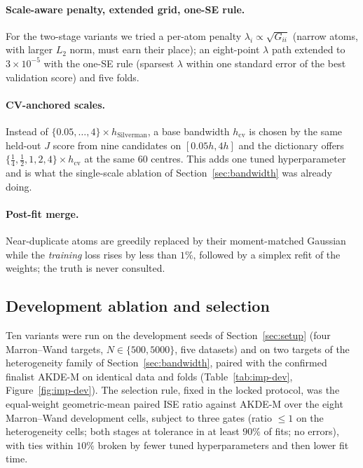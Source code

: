 \paragraph{Scale-aware penalty, extended grid, one-SE rule.} For the
two-stage variants we tried a per-atom penalty $\lambda_i \propto
\sqrt{G_{ii}}$ (narrow atoms, with larger $L_2$ norm, must earn their place);
an eight-point $\lambda$ path extended to $3\times10^{-5}$ with the one-SE
rule (sparsest $\lambda$ within one standard error of the best validation
score) and five folds.

\paragraph{CV-anchored scales.} Instead of $\{0.05,\dots,4\}\times
h_{\mathrm{Silverman}}$, a base bandwidth $h_{\mathrm{cv}}$ is chosen by the
same held-out $J$ score from nine candidates on $[0.05h, 4h]$ and the
dictionary offers $\{\tfrac14, \tfrac12, 1, 2, 4\}\times h_{\mathrm{cv}}$ at
the same $60$ centres. This adds one tuned hyperparameter and is what the
single-scale ablation of Section~\ref{sec:bandwidth} was already doing.

\paragraph{Post-fit merge.} Near-duplicate atoms are greedily replaced by
their moment-matched Gaussian while the \emph{training} loss rises by less
than $1\%$, followed by a simplex refit of the weights; the truth is never
consulted.

\subsection{Development ablation and selection}

Ten variants were run on the development seeds of Section~\ref{sec:setup}
(four Marron--Wand targets, $N\in\{500,5000\}$, five datasets) and on two
targets of the heterogeneity family of Section~\ref{sec:bandwidth}, paired
with the confirmed finalist AKDE-M on identical data and folds
(Table~\ref{tab:imp-dev}, Figure~\ref{fig:imp-dev}). The selection rule,
fixed in the locked protocol, was the equal-weight geometric-mean paired ISE
ratio against AKDE-M over the eight Marron--Wand development cells, subject
to three gates (ratio $\le 1$ on the heterogeneity cells; both stages at
tolerance in at least $90\%$ of fits; no errors), with ties within $10\%$
broken by fewer tuned hyperparameters and then lower fit time.

